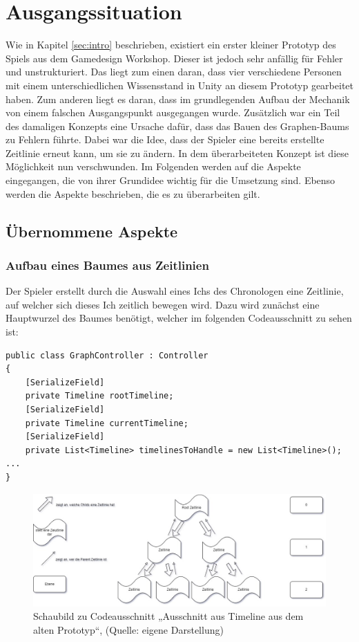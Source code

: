 \section{Ausgangssituation}
Wie in Kapitel \ref{sec:intro}  beschrieben, existiert ein erster kleiner Prototyp des Spiels aus dem Gamedesign Workshop. Dieser ist jedoch sehr anfällig für Fehler und unstrukturiert. Das liegt zum einen daran, dass vier verschiedene Personen mit einem unterschiedlichen Wissensstand in Unity an diesem Prototyp gearbeitet haben. Zum anderen liegt es daran, dass im grundlegenden Aufbau der Mechanik von einem falschen Ausgangspunkt ausgegangen wurde. Zusätzlich war ein Teil des damaligen Konzepts eine Ursache dafür, dass das Bauen des Graphen-Baums zu Fehlern führte. Dabei war die Idee, dass der Spieler eine bereits erstellte Zeitlinie erneut  kann, um sie zu ändern. In dem überarbeiteten Konzept ist diese Möglichkeit nun verschwunden. Im Folgenden werden auf die Aspekte eingegangen, die von ihrer Grundidee wichtig für die Umsetzung sind. Ebenso werden die  Aspekte beschrieben, die es zu überarbeiten gilt.
\subsection{Übernommene Aspekte}
\subsubsection{Aufbau eines Baumes aus Zeitlinien}\label{sec:good_01}
Der Spieler erstellt durch die Auswahl eines Ichs des Chronologen eine Zeitlinie, auf welcher sich dieses Ich zeitlich bewegen wird. Dazu wird zunächst eine Hauptwurzel des Baumes benötigt, welcher im folgenden Codeausschnitt zu sehen ist:
\begin{lstlisting}[caption={Ausschnitt aus GraphController aus dem alten Prototypen}, label={sec:old_graphController}]
public class GraphController : Controller
{
    [SerializeField]
    private Timeline rootTimeline;
    [SerializeField]
    private Timeline currentTimeline;
    [SerializeField]
    private List<Timeline> timelinesToHandle = new List<Timeline>();
...
}
\end{lstlisting}
\label{sec:rootTimeline_pld}

\begin{figure}[ht]
\centering
\includegraphics[width=1\linewidth]{content/pictures/Schaubild Timeline.jpg}
\caption{Schaubild zu Codeausschnitt „Ausschnitt aus Timeline aus dem alten Prototyp“, (Quelle: eigene Darstellung)}
\label{fig:codesnippet_timeline}
\end{figure}

